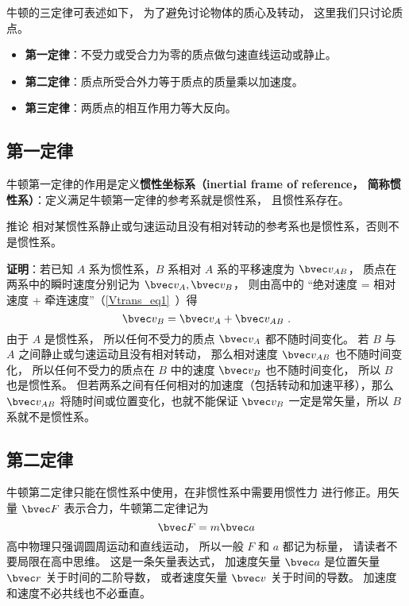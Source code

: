 

牛顿的三定律可表述如下， 为了避免讨论物体的质心及转动， 这里我们只讨论质点。
\begin{itemize}
\item \textbf{第一定律}：不受力或受合力为零的质点做匀速直线运动或静止。
\item \textbf{第二定律}：质点所受合外力等于质点的质量乘以加速度。
\item \textbf{第三定律}：两质点的相互作用力等大反向。
\end{itemize}

\subsection{第一定律}

牛顿第一定律的作用是定义\textbf{惯性坐标系（inertial frame of reference， 简称惯性系）}：定义满足牛顿第一定律的参考系就是惯性系， 且惯性系存在。

\begin{corollary}{推论}
相对某惯性系静止或匀速运动且没有相对转动的参考系也是惯性系，否则不是惯性系。
\end{corollary}
\textbf{证明}：若已知 $A$ 系为惯性系，$B$ 系相对 $A$ 系的平移速度为 $\bvec v_{AB}$， 质点在两系中的瞬时速度分别记为 $\bvec v_A, \bvec v_B$， 则由高中的 “绝对速度 = 相对速度 + 牵连速度”（\autoref{Vtrans_eq1}~）得
\begin{equation}
\bvec v_{B} = \bvec v_{A} + \bvec v_{AB}~.
\end{equation}
由于 $A$ 是惯性系， 所以任何不受力的质点 $\bvec v_{A}$ 都不随时间变化。 若 $B$ 与 $A$ 之间静止或匀速运动且没有相对转动， 那么相对速度 $\bvec v_{AB}$ 也不随时间变化， 所以任何不受力的质点在 $B$ 中的速度 $\bvec v_{B}$ 也不随时间变化， 所以 $B$ 也是惯性系。 但若两系之间有任何相对的加速度（包括转动和加速平移），那么 $\bvec v_{AB}$ 将随时间或位置变化，也就不能保证 $\bvec v_B$ 一定是常矢量，所以 $B$ 系就不是惯性系。


\subsection{第二定律}
牛顿第二定律只能在惯性系中使用，在非惯性系中需要用惯性力 进行修正。用矢量 $\bvec F$ 表示合力，牛顿第二定律记为
\begin{equation}\label{New3_eq1}
\bvec F = m\bvec a
\end{equation}
高中物理只强调圆周运动和直线运动， 所以一般 $F$ 和 $a$ 都记为标量， 请读者不要局限在高中思维。 这是一条矢量表达式， 加速度矢量 $\bvec a$ 是位置矢量 $\bvec r$ 关于时间的二阶导数， 或者速度矢量 $\bvec v$ 关于时间的导数。 加速度和速度不必共线也不必垂直。

